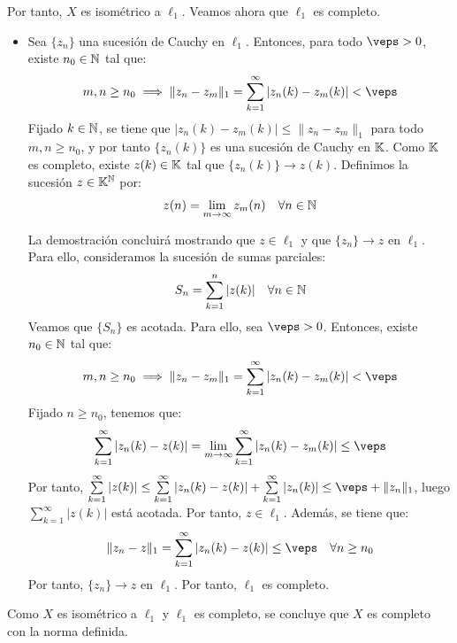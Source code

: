\begin{ejercicio}
Por tanto, $X$ es isométrico a $\ell_1$. Veamos ahora que $\ell_1$ es completo.
\begin{itemize}
    \item Sea $\{z_n\}$ una sucesión de Cauchy en $\ell_1$. Entonces, para todo $\veps > 0$, existe $n_0 \in \mathbb{N}$ tal que:
    \begin{equation*}
        m, n \geq n_0 \implies \|z_n - z_m\|_1 = \sum_{k=1}^\infty |z_n(k) - z_m(k)| < \veps
    \end{equation*}
    Fijado $k \in \mathbb{N}$, se tiene que $|z_n(k)-z_m(k)| \leq \|z_n - z_m\|_1$ para todo $m, n \geq n_0$, y por tanto $\{z_n(k)\}$ es una sucesión de Cauchy en $\mathbb{K}$. Como $\mathbb{K}$ es completo, existe $z(k) \in \mathbb{K}$ tal que $\{z_n(k)\} \to z(k)$. Definimos la sucesión $z \in \mathbb{K}^{\mathbb{N}}$ por:
    \begin{equation*}
        z(n) = \lim_{m \to \infty} z_m(n) \quad \forall n \in \mathbb{N}
    \end{equation*}

    La demostración concluirá mostrando que $z \in \ell_1$ y que $\{z_n\} \to z$ en $\ell_1$. Para ello, consideramos la sucesión de sumas parciales:
    \begin{equation*}
        S_n = \sum_{k=1}^n |z(k)| \quad \forall n \in \mathbb{N}
    \end{equation*}
    Veamos que $\{S_n\}$ es acotada. Para ello, sea $\veps>0$. Entonces, existe $n_0 \in \mathbb{N}$ tal que:
    \begin{equation*}
        m, n \geq n_0 \implies \|z_n - z_m\|_1 = \sum_{k=1}^\infty |z_n(k) - z_m(k)| < \veps
    \end{equation*}
    Fijado $n \geq n_0$, tenemos que:
    \begin{equation*}
        \sum_{k=1}^\infty |z_n(k) - z(k)| = \lim_{m \to \infty} \sum_{k=1}^\infty |z_n(k) - z_m(k)| \leq \veps
    \end{equation*}
    Por tanto, $\sum\limits_{k=1}^\infty |z(k)| \leq \sum\limits_{k=1}^\infty |z_n(k) - z(k)| + \sum\limits_{k=1}^\infty |z_n(k)| \leq \veps + \|z_n\|_1$, luego $\sum\limits_{k=1}^\infty |z(k)|$ está acotada. Por tanto, $z \in \ell_1$. Además, se tiene que:
    \begin{equation*}
        \|z_n - z\|_1 = \sum_{k=1}^\infty |z_n(k) - z(k)| \leq \veps \quad \forall n \geq n_0
    \end{equation*}
    Por tanto, $\{z_n\} \to z$ en $\ell_1$. Por tanto, $\ell_1$ es completo.
\end{itemize}

Como $X$ es isométrico a $\ell_1$ y $\ell_1$ es completo, se concluye que $X$ es completo con la norma definida.
\end{ejercicio}

